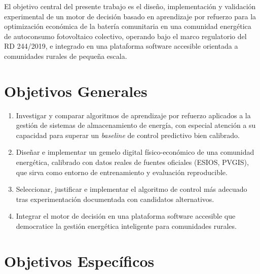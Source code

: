 \documentclass[12pt, a4paper, twoside]{report}
\begin{document}
El objetivo central del presente trabajo es el diseño, implementación y
validación experimental de un motor de decisión basado en aprendizaje por
refuerzo para la optimización económica de la batería comunitaria en una
comunidad energética de autoconsumo fotovoltaico colectivo, operando bajo el
marco regulatorio del RD 244/2019, e integrado en una plataforma software
accesible orientada a comunidades rurales de pequeña escala.

\section{Objetivos Generales}

\begin{enumerate}[label=\textbf{OG\arabic*.}]
  \item Investigar y comparar algoritmos de aprendizaje por refuerzo aplicados
    a la gestión de sistemas de almacenamiento de energía, con especial atención
    a su capacidad para superar un \textit{baseline} de control predictivo bien
    calibrado.
  \item Diseñar e implementar un gemelo digital físico-económico de una comunidad
    energética, calibrado con datos reales de fuentes oficiales (ESIOS, PVGIS),
    que sirva como entorno de entrenamiento y evaluación reproducible.
  \item Seleccionar, justificar e implementar el algoritmo de control más adecuado
    tras experimentación documentada con candidatos alternativos.
  \item Integrar el motor de decisión en una plataforma software accesible que
    democratice la gestión energética inteligente para comunidades rurales.
\end{enumerate}

\section{Objetivos Específicos}
\end{document}
